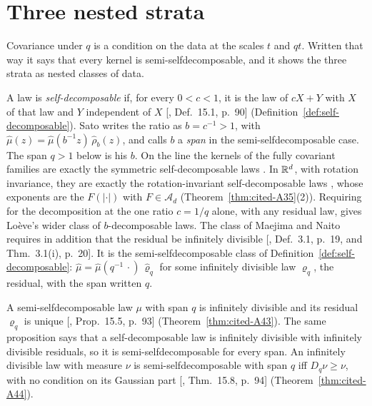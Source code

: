 \section{Three nested strata}
\label{sec:pyramid-strata}

Covariance under $q$ is a condition on the \Levy{} data at the scales $t$ and $qt$. Written that way
it says that every kernel is semi-selfdecomposable, and it shows the three strata as nested classes
of data.

A law is \emph{self-decomposable} if, for every $0 < c < 1$, it is the law of $cX + Y$ with $X$ of that
law and $Y$ independent of $X$ [, Def.~15.1, p.~90]
(Definition~\ref{def:self-decomposable}). Sato writes the ratio as $b = c^{-1} > 1$, with
$\widehat\mu(z) = \widehat\mu(b^{-1}z)\,\widehat\rho_b(z)$, and calls $b$ a \emph{span} in the
semi-selfdecomposable case. The span $q > 1$ below is his $b$. On the line the kernels of the fully
covariant families are exactly the symmetric self-decomposable laws
. In $\mathbb{R}^d$, with rotation invariance, they are exactly the
rotation-invariant self-decomposable laws , whose exponents are
the $F(|\cdot|)$ with $F \in \mathcal{A}_d$ (Theorem~\ref{thm:cited-A35}(2)). Requiring for the
decomposition at the one ratio $c = 1/q$ alone, with any residual law, gives Lo\`eve's wider class
of $b$-decomposable laws. The class of Maejima and Naito requires in addition that the residual be
infinitely divisible [, Def.~3.1, p.~19, and Thm.~3.1(i), p.~20]. It is the semi-selfdecomposable
class of Definition~\ref{def:self-decomposable}: $\widehat\mu = \widehat\mu(q^{-1}\,\cdot)\,\widehat\varrho_q$
for some infinitely divisible law $\varrho_q$, the residual, with the span written $q$.

A semi-selfdecomposable law $\mu$ with span $q$ is infinitely divisible and its residual
$\varrho_q$ is unique [, Prop.~15.5,
p.~93] (Theorem~\ref{thm:cited-A43}). The same proposition says that a self-decomposable law is
infinitely divisible with infinitely divisible residuals, so it is semi-selfdecomposable for every
span. An infinitely divisible law with \Levy{} measure $\nu$ is semi-selfdecomposable with span $q$
iff $D_q\nu \ge \nu$, with no condition on its Gaussian part [, Thm.~15.8,
p.~94] (Theorem~\ref{thm:cited-A44}).

